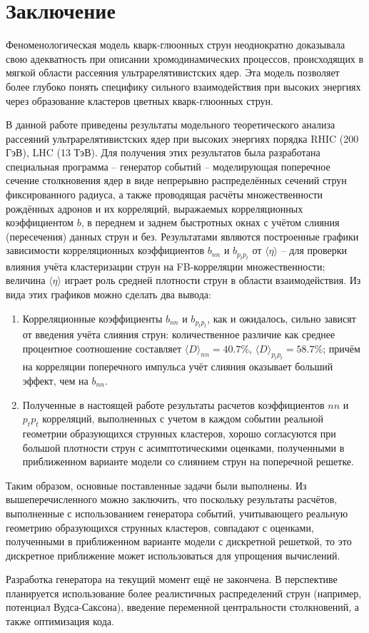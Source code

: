 \section{Заключение}
Феноменологическая модель кварк-глюонных струн неоднократно доказывала свою адекватность при описании хромодинамических процессов, происходящих в мягкой области рассеяния ультрарелятивистских ядер. Эта модель позволяет более глубоко понять специфику сильного взаимодействия при высоких энергиях через образование кластеров цветных кварк-глюонных струн. 

В данной работе приведены результаты модельного теоретического анализа рассеяний ультрарелятивистских ядер при высоких энергиях порядка RHIC (200 ГэВ), LHC (13 ТэВ). 
Для получения этих результатов была разработана специальная программа -- генератор событий -- моделирующая поперечное сечение столкновения ядер в виде непрерывно распределённых сечений струн фиксированного радиуса, а также проводящая расчёты множественности рождённых адронов и их корреляций, выражаемых корреляционных коэффициентом $b$, в переднем и заднем быстротных окнах с учётом слияния (пересечения) данных струн и без. 
Результатами являются построенные графики зависимости корреляционных коэффициентов $b_{nn}$ и $b_{p_tp_t}$ от $\langle \eta \rangle$ -- для проверки влияния учёта кластеризации струн на FB-корреляции множественности; величина $\langle \eta \rangle$ играет роль средней плотности струн в области взаимодействия. 
Из вида этих графиков можно сделать два вывода: 
\begin{enumerate}[label=\arabic*.]
\item	Корреляционные коэффициенты $b_{nn}$ и $b_{p_tp_t}$, как и ожидалось, сильно зависят от введения учёта слияния струн: количественное различие как среднее процентное соотношение составляет $\langle D \rangle _{nn} = 40.7 \%$, $\langle D \rangle _{p_tp_t} = 58.7 \%$; причём на корреляции поперечного импульса учёт слияния оказывает больший эффект, чем на $b_{nn}$.
\item   Полученные в настоящей работе результаты расчетов коэффициентов $nn$ и $p_tp_t$ корреляций, выполненных с учетом в каждом событии реальной геометрии образующихся струнных кластеров, хорошо согласуются при большой плотности струн с асимптотическими оценками, полученными в приближенном варианте модели со слиянием струн на поперечной решетке.
\end{enumerate}
Таким образом, основные поставленные задачи были выполнены. Из вышеперечисленного можно заключить, что поскольку результаты расчётов, выполненные с использованием генератора событий, учитывающего реальную геометрию образующихся струнных кластеров, совпадают с оценками, полученными в приближенном варианте модели с дискретной решеткой, то это дискретное приближение может использоваться для упрощения вычислений.

Разработка генератора на текущий момент ещё не закончена. В перспективе планируется использование более реалистичных распределений струн (например, потенциал Вудса-Саксона), введение переменной центральности столкновений, а также оптимизация кода.
